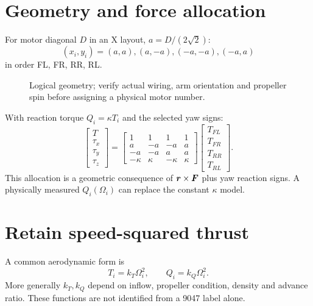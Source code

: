 \section{Geometry and force allocation}
For motor diagonal $D$ in an X layout, $a=D/(2\sqrt2)$:
\begin{equation}
(x_i,y_i)=
(a,a),(a,-a),(-a,-a),(-a,a)
\end{equation}
in order FL, FR, RR, RL.
\begin{figure}[ht]
\centering
{}
\caption{Logical geometry; verify actual wiring, arm orientation and propeller
spin before assigning a physical motor number.}
\end{figure}
With reaction torque $Q_i=\kappa T_i$ and the selected yaw signs:
\begin{equation}
\begin{bmatrix}T\\\tau_x\\\tau_y\\\tau_z\end{bmatrix}=
\begin{bmatrix}
1&1&1&1\\a&-a&-a&a\\-a&-a&a&a\\-\kappa&\kappa&-\kappa&\kappa
\end{bmatrix}
\begin{bmatrix}T_{FL}\\T_{FR}\\T_{RR}\\T_{RL}\end{bmatrix}.
\end{equation}
This allocation is a geometric consequence of $\bm{r}\times\bm{F}$ plus yaw
reaction signs. A physically measured $Q_i(\Omega_i)$ can replace the constant
$\kappa$ model.

\section{Retain speed-squared thrust}
A common aerodynamic form is
\begin{equation}
T_i=k_T\Omega_i^2,\qquad Q_i=k_Q\Omega_i^2.
\end{equation}
More generally $k_T,k_Q$ depend on inflow, propeller condition, density and advance
ratio. These functions are not identified from a 9047 label alone.

